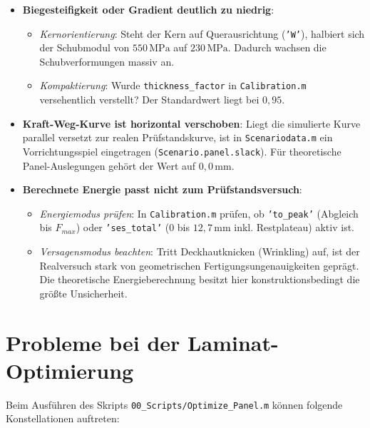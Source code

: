 \begin{itemize}
    \item \textbf{Biegesteifigkeit oder Gradient deutlich zu niedrig}:
    \begin{itemize}
        \item \textit{Kernorientierung}: Steht der Kern auf Querausrichtung (\texttt{'W'}), halbiert sich der Schubmodul von $550\,\text{MPa}$ auf $230\,\text{MPa}$. Dadurch wachsen die Schubverformungen massiv an.
        \item \textit{Kompaktierung}: Wurde \texttt{thickness\_factor} in \texttt{Calibration.m} versehentlich verstellt? Der Standardwert liegt bei $0{,}95$.
    \end{itemize}

    \item \textbf{Kraft-Weg-Kurve ist horizontal verschoben}:
    Liegt die simulierte Kurve parallel versetzt zur realen Prüfstandskurve, ist in \texttt{Scenariodata.m} ein Vorrichtungsspiel eingetragen (\texttt{Scenario.panel.slack}). Für theoretische Panel-Auslegungen gehört der Wert auf $0{,}0\,\text{mm}$.

    \item \textbf{Berechnete Energie passt nicht zum Prüfstandsversuch}:
    \begin{itemize}
        \item \textit{Energiemodus prüfen}: In \texttt{Calibration.m} prüfen, ob \texttt{'to\_peak'} (Abgleich bis $F_{max}$) oder \texttt{'ses\_total'} ($0$ bis $12{,}7\,\text{mm}$ inkl. Restplateau) aktiv ist.
        \item \textit{Versagensmodus beachten}: Tritt Deckhautknicken (Wrinkling) auf, ist der Realversuch stark von geometrischen Fertigungsungenauigkeiten geprägt. Die theoretische Energieberechnung besitzt hier konstruktionsbedingt die größte Unsicherheit.
    \end{itemize}
\end{itemize}

\section{Probleme bei der Laminat-Optimierung} \label{sec:ts_performance}

Beim Ausführen des Skripts \texttt{00\_Scripts/Optimize\_Panel.m} können folgende Konstellationen auftreten:

